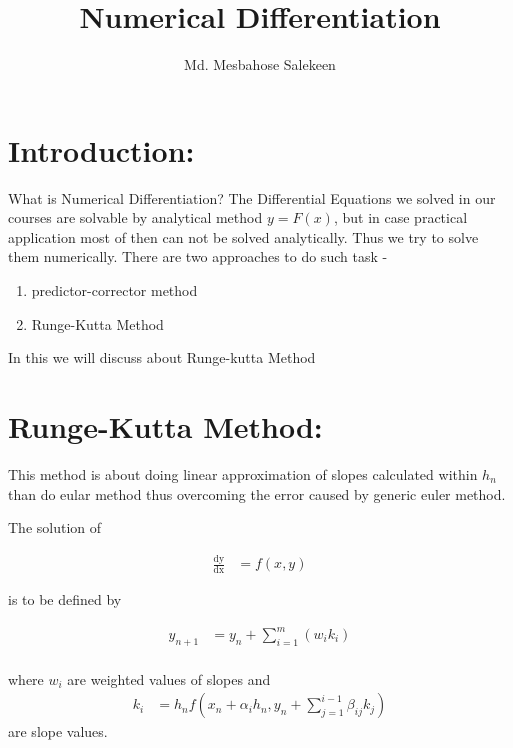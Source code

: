 \documentclass[12 pt]{article}
\title{Numerical Differentiation}
\author{Md. Mesbahose Salekeen}
\date{}
\begin{document}
\maketitle

\section{Introduction:}

What is Numerical Differentiation? The Differential Equations we solved in our courses are solvable by analytical method $y=F(x)$, but in case practical application most of then can not be solved analytically. Thus we try to solve them numerically. There are two approaches to do such task -
\begin{enumerate}
\item predictor-corrector method
\item Runge-Kutta Method
\end{enumerate}

In this we will discuss about Runge-kutta Method

\section{Runge-Kutta Method:}

This method is about doing linear approximation of slopes calculated within $h_{n}$ than do eular method thus overcoming the error caused by generic euler method. 

The solution of 

{
\Large
\begin{equation}\label{E3}
\begin{split}
\frac{\mathop{\mathrm{d}y}}{\mathop{\mathrm{d}x}} &= f(x,y)
\end{split}
\end{equation}
}

is to be defined by

{
\Large
\begin{equation}\label{E1}
\begin{split}
y_{n+1} & = y_{n} + \sum_{i=1}^{m}(w_{i}k_{i}) \\
\end{split}
\end{equation}
}

where $w_{i}$ are weighted values of slopes and 
{
\Large
\begin{equation}\label{E2}
\begin{split}
k_{i} &= h_{n}f(x_{n}+\alpha_{i}h_{n}, y_{n}+\sum_{j=1}^{i-1}\beta_{ij}k_{j})
\end{split}
\end{equation}
}
are slope values.
\end{document}
